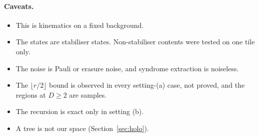 \paragraph{Caveats.}
\begin{itemize}[nosep]
\item This is kinematics on a fixed background.
\item The states are stabiliser states. Non-stabiliser contents were tested on one tile only.
\item The noise is Pauli or erasure noise, and syndrome extraction is noiseless.
\item The $\lfloor r/2\rfloor$ bound is observed in every setting-(a) case, not proved, and the regions at $D\ge2$ are samples.
\item The recursion is exact only in setting (b).
\item A tree is not our space (Section~\ref{sec:holo}).
\end{itemize}
